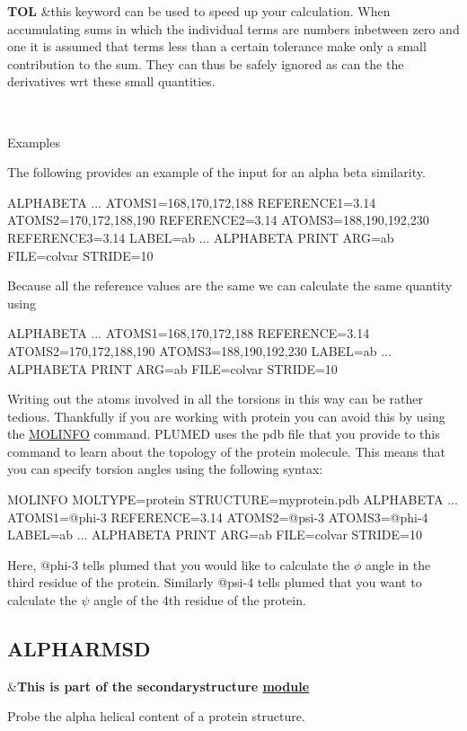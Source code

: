 \begin{TabularC}{2}
\hline
{\bfseries  T\+O\+L } &this keyword can be used to speed up your calculation. When accumulating sums in which the individual terms are numbers inbetween zero and one it is assumed that terms less than a certain tolerance make only a small contribution to the sum. They can thus be safely ignored as can the the derivatives wrt these small quantities.  

\\
\end{TabularC}


\begin{DoxyParagraph}{Examples}

\end{DoxyParagraph}
The following provides an example of the input for an alpha beta similarity.

\begin{DoxyVerb}ALPHABETA ...
ATOMS1=168,170,172,188 REFERENCE1=3.14 
ATOMS2=170,172,188,190 REFERENCE2=3.14 
ATOMS3=188,190,192,230 REFERENCE3=3.14
LABEL=ab
... ALPHABETA
PRINT ARG=ab FILE=colvar STRIDE=10
\end{DoxyVerb}


Because all the reference values are the same we can calculate the same quantity using

\begin{DoxyVerb}ALPHABETA ...
ATOMS1=168,170,172,188 REFERENCE=3.14 
ATOMS2=170,172,188,190 
ATOMS3=188,190,192,230 
LABEL=ab
... ALPHABETA
PRINT ARG=ab FILE=colvar STRIDE=10
\end{DoxyVerb}


Writing out the atoms involved in all the torsions in this way can be rather tedious. Thankfully if you are working with protein you can avoid this by using the \hyperlink{MOLINFO}{M\+O\+L\+I\+N\+F\+O} command. P\+L\+U\+M\+E\+D uses the pdb file that you provide to this command to learn about the topology of the protein molecule. This means that you can specify torsion angles using the following syntax\+:

\begin{DoxyVerb}MOLINFO MOLTYPE=protein STRUCTURE=myprotein.pdb
ALPHABETA ...
ATOMS1=@phi-3 REFERENCE=3.14
ATOMS2=@psi-3
ATOMS3=@phi-4
LABEL=ab
... ALPHABETA 
PRINT ARG=ab FILE=colvar STRIDE=10
\end{DoxyVerb}


Here, @phi-\/3 tells plumed that you would like to calculate the $\phi$ angle in the third residue of the protein. Similarly @psi-\/4 tells plumed that you want to calculate the $\psi$ angle of the 4th residue of the protein. \hypertarget{ALPHARMSD}{}\subsection{A\+L\+P\+H\+A\+R\+M\+S\+D}\label{ALPHARMSD}
\begin{TabularC}{2}
\hline
&{\bfseries  This is part of the secondarystructure \hyperlink{mymodules}{module }}   \\
\end{TabularC}
Probe the alpha helical content of a protein structure.


